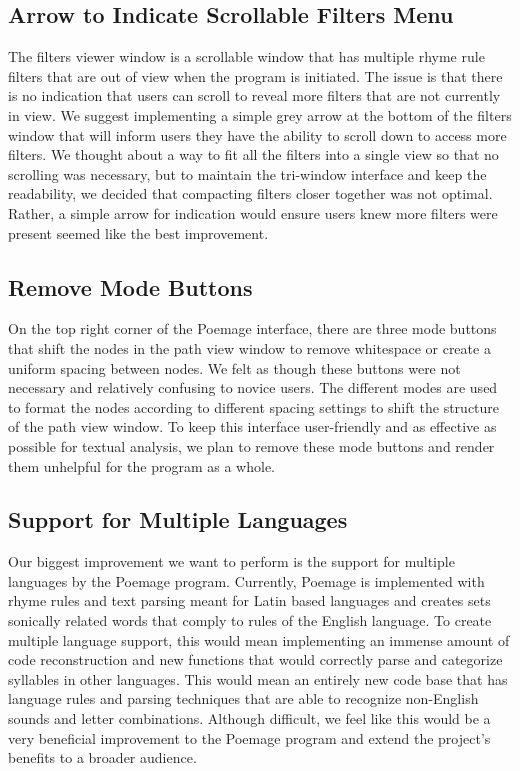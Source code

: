 \documentclass[journal]{vgtc}                %
\begin{document}
\subsection{Arrow to Indicate Scrollable Filters Menu}
The filters viewer window is a scrollable window that has multiple rhyme rule filters that are out of view when the program is initiated. The issue is that there is no indication that users can scroll to reveal more filters that are not currently in view. We suggest implementing a simple grey arrow at the bottom of the filters window that will inform users they have the ability to scroll down to access more filters. We thought about a way to fit all the filters into a single view so that no scrolling was necessary, but to maintain the tri-window interface and keep the readability, we decided that compacting filters closer together was not optimal. Rather, a simple arrow for indication would ensure users knew more filters were present seemed like the best improvement. 
\subsection{Remove Mode Buttons}
On the top right corner of the Poemage interface, there are three mode buttons that shift the nodes in the path view window to remove whitespace or create a uniform spacing between nodes. We felt as though these buttons were not necessary and relatively confusing to novice users. The different modes are used to format the nodes according to different spacing settings to shift the structure of the path view window. To keep this interface user-friendly and as effective as possible for textual analysis, we plan to remove these mode buttons and render them unhelpful for the program as a whole. 

\subsection{Support for Multiple Languages}
Our biggest improvement we want to perform is the support for multiple languages by the Poemage program. Currently, Poemage is implemented with rhyme rules and text parsing meant for Latin based languages and creates sets sonically related words that comply to rules of the English language. To create multiple language support, this would mean implementing an immense amount of code reconstruction and new functions that would correctly parse and categorize syllables in other languages. This would mean an entirely new code base that has language rules and parsing techniques that are able to recognize non-English sounds and letter combinations. Although difficult, we feel like this would be a very beneficial improvement to the Poemage program and extend the project’s benefits to a broader audience.
\end{document}

